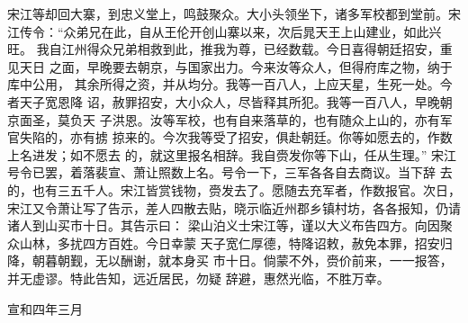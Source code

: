宋江等却回大寨，到忠义堂上，鸣鼓聚众。大小头领坐下，诸多军校都到堂前。宋
江传令：“众弟兄在此，自从王伦开创山寨以来，次后晁天王上山建业，如此兴旺。
我自江州得众兄弟相救到此，推我为尊，已经数载。今日喜得朝廷招安，重见天日
之面，早晚要去朝京，与国家出力。今来汝等众人，但得府库之物，纳于库中公用，
其余所得之资，并从均分。我等一百八人，上应天星，生死一处。今者天子宽恩降
诏，赦罪招安，大小众人，尽皆释其所犯。我等一百八人，早晚朝京面圣，莫负天
子洪恩。汝等军校，也有自来落草的，也有随众上山的，亦有军官失陷的，亦有掳
掠来的。今次我等受了招安，俱赴朝廷。你等如愿去的，作数上名进发；如不愿去
的，就这里报名相辞。我自赍发你等下山，任从生理。”
宋江号令已罢，着落裴宣、萧让照数上名。号令一下，三军各各自去商议。当下辞
去的，也有三五千人。宋江皆赏钱物，赍发去了。愿随去充军者，作数报官。次日，
宋江又令萧让写了告示，差人四散去贴，晓示临近州郡乡镇村坊，各各报知，仍请
诸人到山买市十日。其告示曰：
梁山泊义士宋江等，谨以大义布告四方。向因聚众山林，多扰四方百姓。今日幸蒙
天子宽仁厚德，特降诏敕，赦免本罪，招安归降，朝暮朝觐，无以酬谢，就本身买
市十日。倘蒙不外，赍价前来，一一报答，并无虚谬。特此告知，远近居民，勿疑
辞避，惠然光临，不胜万幸。

宣和四年三月

